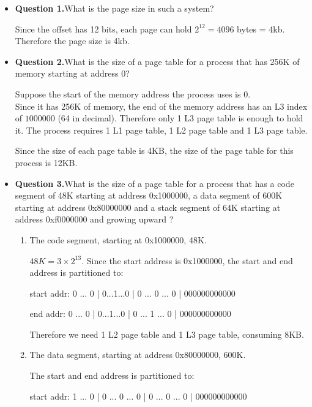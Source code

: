 \documentclass[answers]{exam}
\begin{document}
\begin{itemize}
  \item \textbf{Question 1.}What is the page size in such a system? 
  
  Since the offset has 12 bits, each page can hold $2^{12} = 4096$ bytes = 4kb. Therefore the page size is 4kb.
  
  \vspace{2cm}

  \item \textbf{Question 2.}What is the size of a page table for a process that has 256K of memory starting at address 0? 
  
  Suppose the start of the memory address the process uses is $0$.\\
  Since it has 256K of memory, the end of the memory address has an L3 index of $1000000$ (64 in decimal). Therefore only 1 L3 page table is enough to hold it. The process requires 1 L1 page table, 1 L2 page table and 1 L3 page table.

  Since the size of each page table is 4KB, the size of the page table for this process is 12KB.
  
  \vspace{1.5cm}

  \item \textbf{Question 3.}What is the size of a page table for a process that has a code segment of 48K starting at address 0x1000000, a data segment of 600K starting at address 0x80000000 and a stack segment of 64K starting at address 0xf0000000 and growing upward ? 
  
  \begin{enumerate}
    \item The code segment, starting at 0x1000000, 48K.
    
    $48K = 3 \times 2^{13}$. Since the start address is 0x1000000, the start and end address is partitioned to:

    start addr: 0 ... 0 | 0...1...0 | 0 ... 0 ... 0 | 000000000000

    end addr:  0 ... 0 | 0...1...0 | 0 ... 1 ... 0 | 000000000000

    Therefore we need 1 L2 page table and 1 L3 page table, consuming 8KB.

    \item The data segment, starting at address 0x80000000, 600K.
    
    The start and end address is partitioned to:

    start addr: 1 ... 0 | 0 ... 0 ... 0 | 0 ... 0 ... 0 | 000000000000


\end{enumerate}
\end{itemize}
\end{document}
